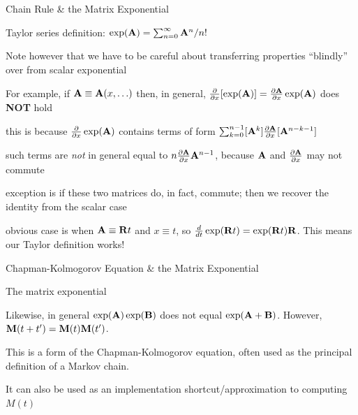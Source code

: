\documentclass{beamer}
\begin{document}
\begin{frame}{Chain Rule \& the Matrix Exponential}

\itemb
\item Taylor series definition: $\exp({\bf A}) = \sum_{n=0}^\infty {\bf A}^n / n!$
 \itemb
 \item Note however that we have to be careful about transferring properties ``blindly'' over from scalar exponential
%
 \item For example, if ${\bf A} \equiv {\bf A}(x,\ldots)$ then, in general, $\frac{\partial}{\partial {x}} [\exp({\bf A})] = \frac{\partial {\bf A}}{\partial {x}} \exp({\bf A})$ does {\bf NOT} hold
\pause
  \itemb
  \item this is because $\frac{\partial}{\partial {x}} \exp({\bf A})$ contains terms of form $\sum_{k=0}^{n-1} [{\bf A}^k] \frac{\partial {\bf A}}{\partial {x}} [{\bf A}^{n-k-1}]$
\pause
  \item such terms are {\em not} in general equal to $n \frac{\partial {\bf A}}{\partial {x}} {\bf A}^{n-1}$, because ${\bf A}$ and $\frac{\partial {\bf A}}{\partial {x}}$ may not commute
\pause
  \item exception is if these two matrices do, in fact, commute; then we recover the identity from the scalar case
%
  \item obvious case is when ${\bf A} \equiv {\bf R}t$ and $x \equiv t$, so $\frac{d}{dt} \exp({\bf R}t) = \exp({\bf R}t) {\bf R}$. This means our Taylor definition works!
  \iteme
 \iteme
\iteme

\end{frame}

\begin{frame}{Chapman-Kolmogorov Equation \& the Matrix Exponential}

\itemb
\item The matrix exponential
 \itemb
 \item Likewise, in general $\exp({\bf A})\exp({\bf B})$ does not equal $\exp({\bf A}+{\bf B})$. However, ${\bf M}(t+t') = {\bf M}(t) {\bf M}(t')$.\
%
 \item This is a form of the \alert{Chapman-Kolmogorov equation}, often used as the principal definition of a Markov chain.
\pause
%
 \item It can also be used as an implementation shortcut/approximation to computing $M(t)$
 \iteme
\iteme

\end{frame}
\end{document}
